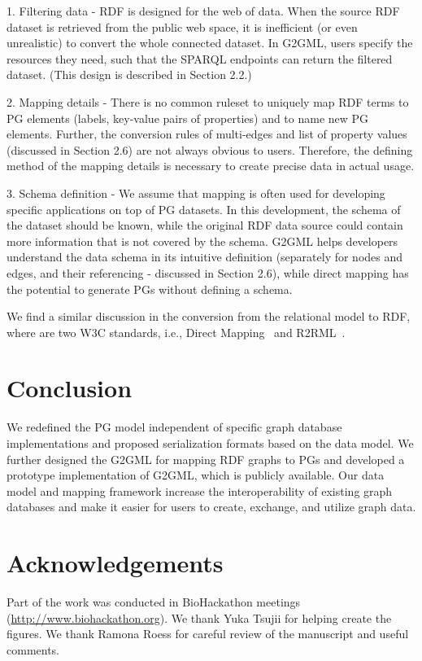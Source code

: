 \documentclass[runningheads]{llncs}
\begin{document}
1. Filtering data - RDF is designed for the web of data. When the source RDF dataset is retrieved from the public web space, it is inefficient (or even unrealistic) to convert the whole connected dataset. In G2GML, users specify the resources they need, such that the SPARQL endpoints can return the filtered dataset. (This design is described in Section 2.2.)

2. Mapping details - There is no common ruleset to uniquely map RDF terms to PG elements (labels, key-value pairs of properties) and to name new PG elements. Further, the conversion rules of multi-edges and list of property values (discussed in Section 2.6) are not always obvious to users. Therefore, the defining method of the mapping details is necessary to create precise data in actual usage.

3. Schema definition - We assume that mapping is often used for developing specific applications on top of PG datasets. In this development, the schema of the dataset should be known, while the original RDF data source could contain more information that is not covered by the schema. G2GML helps developers understand the data schema in its intuitive definition (separately for nodes and edges, and their referencing - discussed in Section 2.6), while direct mapping has the potential to generate PGs without defining a schema.

We find a similar discussion in the conversion from the relational model to RDF, where are two W3C standards, i.e., Direct Mapping~\cite{dm} and R2RML~\cite{r2rml}.

\section{Conclusion}
We redefined the PG model independent of specific graph database implementations and proposed serialization formats based on the data model.
We further designed the G2GML for mapping RDF graphs to PGs and developed a prototype implementation of G2GML, which is publicly available.
Our data model and mapping framework increase the interoperability of existing graph databases and make it easier for users to create, exchange, and utilize graph data.

\section*{Acknowledgements}
Part of the work was conducted in BioHackathon meetings (\url{http://www.biohackathon.org}). We thank Yuka Tsujii for helping create the figures. We thank Ramona Roess for careful review of the manuscript and useful comments.
\end{document}

